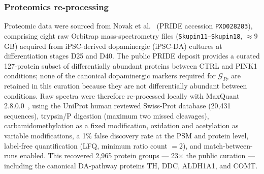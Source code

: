 \documentclass[5p,times,twocolumn]{elsarticle}
\begin{document}
\subsubsection{Proteomics re-processing}
Proteomic data were sourced from Novak et al.~\cite{novak2022single}
(PRIDE accession \texttt{PXD028283}), comprising eight raw
Orbitrap mass-spectrometry files (\texttt{Skupin11--Skupin18},
$\approx 9$\,GB) acquired from iPSC-derived dopaminergic
(iPSC-DA) cultures at differentiation stages D25 and D40.
The public PRIDE deposit provides a curated 127-protein subset
of differentially abundant proteins between CTRL and PINK1
conditions; none of the canonical dopaminergic markers required
for $\mathcal{G}_{Pr}$ are retained in this curation because
they are not differentially abundant between conditions.
Raw spectra were therefore re-processed locally with
MaxQuant 2.8.0.0~\cite{cox2008maxquant}, using the UniProt
human reviewed Swiss-Prot database (20,431 sequences),
trypsin/P digestion (maximum two missed cleavages),
carbamidomethylation as a fixed modification, oxidation and
acetylation as variable modifications, a 1\% false discovery
rate at the PSM and protein level, label-free quantification
(LFQ, minimum ratio count $= 2$), and match-between-runs
enabled.
This recovered 2,965 protein groups --- 23$\times$ the
public curation --- including the canonical DA-pathway
proteins TH, DDC, ALDH1A1, and COMT.
\end{document}
